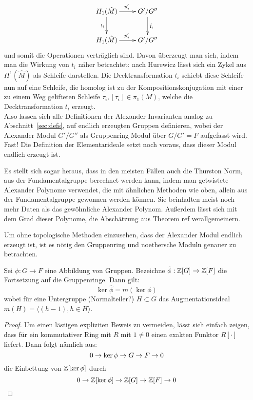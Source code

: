 \[
	\begin{xy}
		\xymatrix{H_1(\hat M) \ar[d]_{t_i} \ar[r]^{p'_*} & G'/G'' \ar[d]^{\hat t_i}\\
		H_1(\hat M)  \ar[r]^{p'_*} & G'/G'' }
	\end{xy}
\]
und somit die Operationen verträglich sind. Davon überzeugt man sich, indem man die Wirkung von $t_i$ näher betrachtet: nach Hurewicz lässt sich ein Zykel aus $H^1(\hat M)$ als Schleife darstellen. Die Decktransformation $t_i$ schiebt diese Schleife nun auf eine Schleife, die homolog ist zu der Kompositionskonjugation mit einer zu einem Weg gelifteten Schleife $\tau_i, [\tau_i] \in \pi_1(M)$, welche die Decktransformation $t_i$ erzeugt. \\
Also lassen sich alle Definitionen der Alexander Invarianten analog zu Abschnitt~\ref{sec:defs}, auf endlich erzeugten Gruppen definieren, wobei der Alexander Modul $G'/G''$ als Gruppenring-Modul über $G/G'=F$ aufgefasst wird. Fast! Die Definition der Elementarideale setzt noch voraus, dass dieser Modul endlich erzeugt ist.


Es stellt sich sogar heraus, dass in den meisten Fällen auch die Thurston Norm, aus der Fundamentalgruppe berechnet werden kann, indem man getwistete Alexander Polynome verwendet, die mit ähnlichen Methoden wie oben, allein aus der Fundamentalgruppe gewonnen werden können. Sie beinhalten meist noch mehr Daten als das gewöhnliche Alexander Polynom. Außerdem lässt sich mit dem Grad dieser Polynome, die Abschätzung aus Theorem ref verallgemeinern.

Um ohne topologische Methoden einzusehen, dass der Alexander Modul endlich erzeugt ist, ist es nötig den Gruppenring und noethersche Moduln genauer zu betrachten.

\begin{lem}
	Sei $\phi:G \to F$ eine Abbildung von Gruppen. Bezeichne $\hat \phi: \mathbb{Z}[G] \to \mathbb{Z}[F]$ die Fortsetzung auf die Gruppenringe. Dann gilt:
	\[
		\ker\hat\phi = m(\ker\phi)
	\]
	wobei für eine Untergruppe (Normalteiler?) $H\subset G$ das Augmentationsideal $m(H) = \langle(h-1), h \in H\rangle$.
\end{lem}
\begin{proof}
	Um einen lästigen expliziten Beweis zu vermeiden, lässt sich einfach zeigen, dass für ein kommutativer Ring mit $R$ mit $1\neq 0$ einen exakten Funktor $R[\cdot]$ liefert. Dann folgt nämlich aus:
	\[
		0\to\ker\phi\to G\to F\to0
	\]
	die Einbettung von $\mathbb{Z}[\ker\phi]$ durch
	\[
		0\to\mathbb{Z}[\ker\phi]\to\mathbb{Z}[G]\to\mathbb{Z}[F]\to0
	\]
\end{proof}

